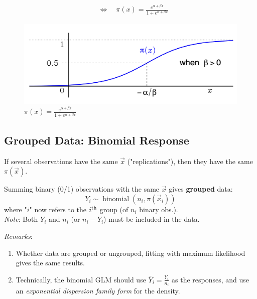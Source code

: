 \documentclass[11pt]{elegantbook}
\begin{document}
\begin{example}
\begin{enumerate}[$\bullet$]
\begin{equation}
\begin{aligned}
                &\Leftrightarrow\quad \pi(x)=\frac{e^{\alpha+\beta x}}{1+e^{\alpha+\beta x}}
            \end{aligned}
            \nonumber
        \end{equation}
        \begin{center}\begin{figure}[htbp]
            \centering
            \includegraphics[scale=0.18]{logit.png}
            \caption{$\pi(x)=\frac{e^{\alpha+\beta x}}{1+e^{\alpha+\beta x}}$}
            \label{}
        \end{figure}\end{center}
    \end{enumerate}
\end{example}

\subsection{Grouped Data: Binomial Response}
If several observations have the same $\vec{x}$ ("replications"), then they have the same $\pi(\vec{x})$.

Summing binary (0/1) observations with the same $\vec{x}$ gives \textbf{grouped} data:
$$
Y_i \sim \operatorname{binomial}\left(n_i, \pi\left(\vec{x}_i\right)\right)
$$
where "$i$" now refers to the $i^{\textnormal{th}}$ group (of $n_i$ binary obs.).\\
\textit{Note}: Both $Y_i$ and $n_i$ (or $n_i-Y_i$) must be included in the data.

\textit{Remarks}:
\begin{enumerate}
    \item Whether data are grouped or ungrouped, fitting with maximum likelihood gives the same results.
    \item Technically, the binomial GLM should use $\bar{Y}_i=\frac{Y_i}{n_i}$ as the responses, and use an \textit{exponential dispersion family form} for the density.
\end{enumerate}
\end{document}
